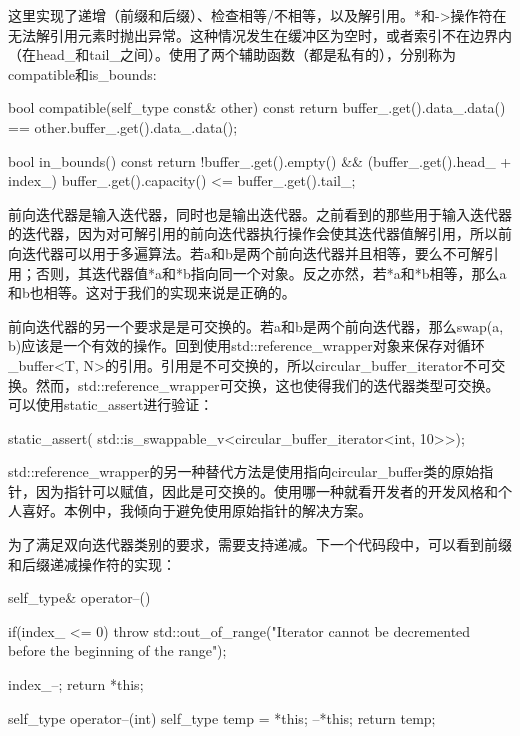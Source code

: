 这里实现了递增（前缀和后缀）、检查相等/不相等，以及解引用。*和->操作符在无法解引用元素时抛出异常。这种情况发生在缓冲区为空时，或者索引不在边界内（在head\_和tail\_之间）。使用了两个辅助函数（都是私有的），分别称为compatible和is\_bounds:

\begin{cpp}
bool compatible(self_type const& other) const
{
	return buffer_.get().data_.data() ==
		   other.buffer_.get().data_.data();
}

bool in_bounds() const
{
	return
		!buffer_.get().empty() &&
		(buffer_.get().head_ + index_) %
		 buffer_.get().capacity() <= buffer_.get().tail_;
}
\end{cpp}

前向迭代器是输入迭代器，同时也是输出迭代器。之前看到的那些用于输入迭代器的迭代器，因为对可解引用的前向迭代器执行操作会使其迭代器值解引用，所以前向迭代器可以用于多遍算法。若a和b是两个前向迭代器并且相等，要么不可解引用；否则，其迭代器值*a和*b指向同一个对象。反之亦然，若*a和*b相等，那么a和b也相等。这对于我们的实现来说是正确的。

前向迭代器的另一个要求是是可交换的。若a和b是两个前向迭代器，那么swap(a, b)应该是一个有效的操作。回到使用std::reference\_wrapper对象来保存对循环\_buffer<T, N>的引用。引用是不可交换的，所以circular\_buffer\_iterator不可交换。然而，std::reference\_wrapper可交换，这也使得我们的迭代器类型可交换。可以使用static\_assert进行验证：

\begin{cpp}
static_assert(
	std::is_swappable_v<circular_buffer_iterator<int, 10>>);
\end{cpp}

\begin{important}
std::reference\_wrapper的另一种替代方法是使用指向circular\_buffer类的原始指针，因为指针可以赋值，因此是可交换的。使用哪一种就看开发者的开发风格和个人喜好。本例中，我倾向于避免使用原始指针的解决方案。
\end{important}

为了满足双向迭代器类别的要求，需要支持递减。下一个代码段中，可以看到前缀和后缀递减操作符的实现：

\begin{cpp}
self_type& operator--()
{
	if(index_ <= 0)
		throw std::out_of_range("Iterator cannot be
			decremented before the beginning of the range");
			
	index_--;
	return *this;
}

self_type operator--(int)
{
	self_type temp = *this;
	--*this;
	return temp;
}
\end{cpp}

